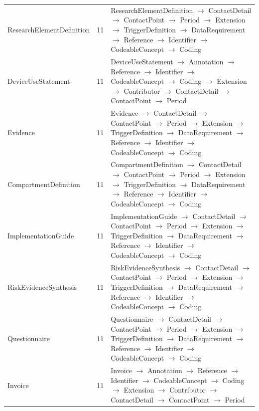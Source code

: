 \begin{longtable}{lrl}
ResearchElementDefinition & 11 & ResearchElementDefinition $\rightarrow$ ContactDetail $\rightarrow$ ContactPoint $\rightarrow$ Period $\rightarrow$ Extension $\rightarrow$ TriggerDefinition $\rightarrow$ DataRequirement $\rightarrow$ Reference $\rightarrow$ Identifier $\rightarrow$ CodeableConcept $\rightarrow$ Coding \\
DeviceUseStatement & 11 & DeviceUseStatement $\rightarrow$ Annotation $\rightarrow$ Reference $\rightarrow$ Identifier $\rightarrow$ CodeableConcept $\rightarrow$ Coding $\rightarrow$ Extension $\rightarrow$ Contributor $\rightarrow$ ContactDetail $\rightarrow$ ContactPoint $\rightarrow$ Period \\
Evidence & 11 & Evidence $\rightarrow$ ContactDetail $\rightarrow$ ContactPoint $\rightarrow$ Period $\rightarrow$ Extension $\rightarrow$ TriggerDefinition $\rightarrow$ DataRequirement $\rightarrow$ Reference $\rightarrow$ Identifier $\rightarrow$ CodeableConcept $\rightarrow$ Coding \\
CompartmentDefinition & 11 & CompartmentDefinition $\rightarrow$ ContactDetail $\rightarrow$ ContactPoint $\rightarrow$ Period $\rightarrow$ Extension $\rightarrow$ TriggerDefinition $\rightarrow$ DataRequirement $\rightarrow$ Reference $\rightarrow$ Identifier $\rightarrow$ CodeableConcept $\rightarrow$ Coding \\
ImplementationGuide & 11 & ImplementationGuide $\rightarrow$ ContactDetail $\rightarrow$ ContactPoint $\rightarrow$ Period $\rightarrow$ Extension $\rightarrow$ TriggerDefinition $\rightarrow$ DataRequirement $\rightarrow$ Reference $\rightarrow$ Identifier $\rightarrow$ CodeableConcept $\rightarrow$ Coding \\
RiskEvidenceSynthesis & 11 & RiskEvidenceSynthesis $\rightarrow$ ContactDetail $\rightarrow$ ContactPoint $\rightarrow$ Period $\rightarrow$ Extension $\rightarrow$ TriggerDefinition $\rightarrow$ DataRequirement $\rightarrow$ Reference $\rightarrow$ Identifier $\rightarrow$ CodeableConcept $\rightarrow$ Coding \\
Questionnaire & 11 & Questionnaire $\rightarrow$ ContactDetail $\rightarrow$ ContactPoint $\rightarrow$ Period $\rightarrow$ Extension $\rightarrow$ TriggerDefinition $\rightarrow$ DataRequirement $\rightarrow$ Reference $\rightarrow$ Identifier $\rightarrow$ CodeableConcept $\rightarrow$ Coding \\
Invoice & 11 & Invoice $\rightarrow$ Annotation $\rightarrow$ Reference $\rightarrow$ Identifier $\rightarrow$ CodeableConcept $\rightarrow$ Coding $\rightarrow$ Extension $\rightarrow$ Contributor $\rightarrow$ ContactDetail $\rightarrow$ ContactPoint $\rightarrow$ Period \\

\end{longtable}
